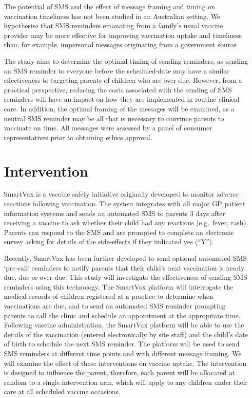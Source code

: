 \documentclass[
  bibliography=totoc]{scrreprt}
\begin{document}
The potential of SMS and the effect of message framing and timing on vaccination timeliness has not been studied in an Australian setting.
We hypothesise that SMS reminders emanating from a family's usual vaccine provider may be more effective for improving vaccination uptake and timeliness than, for example, impersonal messages originating from a government source.

The study aims to determine the optimal timing of sending reminders, as sending an SMS reminder to everyone before the scheduled-date may have a similar effectiveness to targeting parents of children who are over-due.
However, from a practical perspective, reducing the costs associated with the sending of SMS reminders will have an impact on how they are implemented in routine clinical care.
In addition, the optimal framing of the messages will be examined, as a neutral SMS reminder may be all that is necessary to convince parents to vaccinate on time.
All messages were assessed by a panel of consumer representatives prior to obtaining ethics approval.

\hypertarget{intervention}{%
\section{Intervention}\label{intervention}}

SmartVax is a vaccine safety initiative originally developed to monitor adverse reactions following vaccination.
The system integrates with all major GP patient information systems and sends an automated SMS to parents 3 days after receiving a vaccine to ask whether their child had any reactions (e.g.~fever, rash).
Parents can respond to the SMS and are prompted to complete an electronic survey asking for details of the side-effects if they indicated yes (``Y'').

Recently, SmartVax has been further developed to send optional automated SMS `pre-call' reminders to notify parents that their child's next vaccination is nearly due, due or over-due.
This study will investigate the effectiveness of sending SMS reminders using this technology.
The SmartVax platform will interrogate the medical records of children registered at a practice to determine when vaccinations are due, and to send an automated SMS reminder prompting parents to call the clinic and schedule an appointment at the appropriate time.
Following vaccine administration, the SmartVax platform will be able to use the details of the vaccination (entered electronically by site staff) and the child's date of birth to schedule the next SMS reminder.
The platform will be used to send SMS reminders at different time points and with different message framing.
We will examine the effect of these interventions on vaccine uptake.
The intervention is designed to influence the parent, therefore, each parent will be allocated at random to a single intervention arm, which will apply to any children under their care at all scheduled vaccine occasions.
\end{document}
